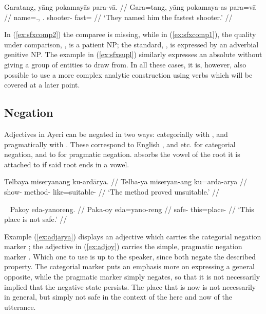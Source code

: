 
\a\label{ex:sfxsupl}\begingl
	\gla Garatang, yāng pokamayās para-vā. //
	\glb Gara=tang, yāng pokamaya-as para=vā //
	\glc name=\TplM{}.\Aarg{}, \TsgM.\Aarg{} shooter-\Parg{} fast=\Supl{} //
	\glft `They named him the fastest shooter.' //
\endgl\xe

In (\ref{ex:sfxcomp2}) the comparee is missing, while in (\ref{ex:sfxcomp1}), 
the quality under comparison, , is a patient NP; the standard, , is 
expressed by an adverbial genitive NP. The example in (\ref{ex:sfxsupl}) 
similarly expresses an absolute without giving a group of entities to draw 
from. 
In all these cases, it is, however, also possible to use a more complex 
analytic construction using verbs which will be covered at a later point.


\subsection{Negation}
\label{subsec:adjneg}

Adjectives in Ayeri can be negated in two ways: categorially with 
, and pragmatically with . These correspond to 
English , and  etc. for categorial negation, and to 
 for pragmatic negation.  absorbs the vowel of the root 
it is attached to if said root ends in a vowel.

\ex\label{ex:adjarya}\begingl
	\gla Telbaya miseryanang ku-ardārya. //
	\glb Telba-ya miseryan-ang ku=arda-arya //
	\glc show-\TsgM{} method-\Aarg{} like=suitable-\Neg{} //
	\glft `The method proved unsuitable.' //
\endgl\xe

\ex~\label{ex:adjoy}\begingl
	\gla Pakoy eda-yanoreng. //
	\glb Paka-oy eda=yano-reng //
	\glc safe-\Neg{} this=place-\AargI{} //
	\glft `This place is not safe.' //
\endgl\xe

Example (\ref{ex:adjarya}) displays an adjective which carries the categorial 
negation marker ; the adjective in (\ref{ex:adjoy}) carries 
the simple, pragmatic negation marker . Which one to use is up 
to the speaker, since both negate the described property. The categorial marker 
puts an emphasis more on expressing a general opposite, while the pragmatic 
marker simply negates, so that it is not necessarily implied that the negative 
state persists. The place that is  now is not 
necessarily  in general, but simply not safe in 
the context of the here and now of the utterance.

